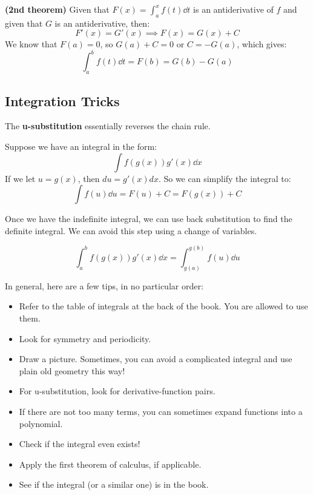 \documentclass{article}
\let\oldtextbf\textbf
\renewcommand{\textbf}[1]{\oldtextbf{#1}\index{#1}}
\begin{document}
\begin{prooof}
    \textbf{(2nd theorem)} Given that $F(x)=\int_a^x f(t) \dd{t}$ is an antiderivative of $f$ and given that $G$ is an antiderivative, then:
    \begin{equation}
        F'(x)=G'(x) \implies F(x) = G(x)+C
        \label{eq:}
    \end{equation}
    We know that $F(a)=0$, so $G(a)+C=0$ or $C=-G(a)$, which gives:
    \begin{equation}
        \int_a^b f(t) \dd{t} = F(b) = G(b) - G(a)
        \label{eq:}
    \end{equation}
\end{prooof}
\subsection{Integration Tricks}
The \textbf{u-substitution} essentially reverses the chain rule.
\begin{idea}
    Suppose we have an integral in the form:
    \begin{equation}
        \int f(g(x))g'(x) \dd{x}
        \label{eq:}
    \end{equation}
    If we let $u=g(x)$, then $du=g'(x) dx$. So we can simplify the integral to:
    \begin{equation}
        \int f(u) \dd{u} = F(u) +C = F(g(x)) + C
        \label{eq:}
    \end{equation}      
\end{idea}
Once we have the indefinite integral, we can use back substitution to find the definite integral. We can avoid this step using a change of variables.
\begin{theorem}
    \begin{equation}
        \int_a^b f(g(x))g'(x)\dd{x} = \int_{g(a)}^{g(b)} f(u) \dd{u}
    \end{equation}
\end{theorem}
In general, here are a few tips, in no particular order:
\begin{itemize}
    \item Refer to the table of integrals at the back of the book. You are allowed to use them.
    \item Look for symmetry and periodicity.
    \item Draw a picture. Sometimes, you can avoid a complicated integral and use plain old geometry this way!
    \item For u-substitution, look for derivative-function pairs.
    \item If there are not too many terms, you can sometimes expand functions into a polynomial.
    \item Check if the integral even exists!
    \item Apply the first theorem of calculus, if applicable.
    \item See if the integral (or a similar one) is in the book.
\end{itemize}
\end{document}

